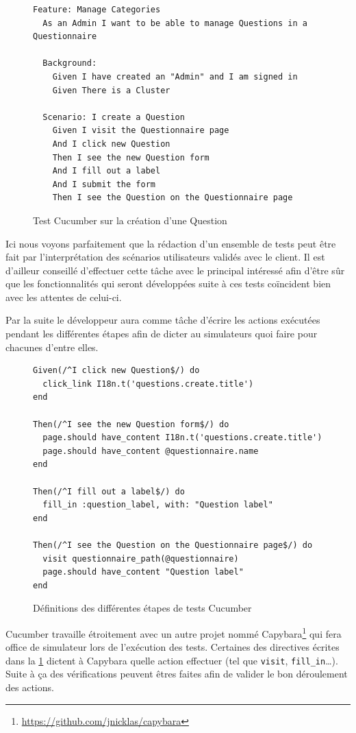 \documentclass[12pt,a4paper]{book}
\begin{document}
\begin{figure}[h]
\lstset{language=ruby}
\begin{lstlisting}
Feature: Manage Categories
  As an Admin I want to be able to manage Questions in a Questionnaire

  Background:
    Given I have created an "Admin" and I am signed in
    Given There is a Cluster

  Scenario: I create a Question
    Given I visit the Questionnaire page
    And I click new Question
    Then I see the new Question form
    And I fill out a label
    And I submit the form
    Then I see the Question on the Questionnaire page
\end{lstlisting}
 \caption{Test Cucumber sur la création d'une Question}
\end{figure}

Ici nous voyons parfaitement que la rédaction d'un ensemble de tests peut être fait par l'interprétation des scénarios utilisateurs validés avec le client. Il est d'ailleur conseillé d'effectuer cette tâche avec le principal intéressé afin d'être sûr que les fonctionnalités qui seront développées suite à ces tests coïncident bien avec les attentes de celui-ci.

Par la suite le développeur aura comme tâche d'écrire les actions exécutées pendant les différentes étapes afin de dicter au simulateurs quoi faire pour chacunes d'entre elles.

\begin{figure}[h]
\lstset{language=ruby}
\begin{lstlisting}
Given(/^I click new Question$/) do
  click_link I18n.t('questions.create.title')
end

Then(/^I see the new Question form$/) do
  page.should have_content I18n.t('questions.create.title')
  page.should have_content @questionnaire.name
end

Then(/^I fill out a label$/) do
  fill_in :question_label, with: "Question label"
end

Then(/^I see the Question on the Questionnaire page$/) do
  visit questionnaire_path(@questionnaire)
  page.should have_content "Question label"
end
\end{lstlisting}
 \caption{Définitions des différentes étapes de tests Cucumber}
 \label{fig.cucumber2}
\end{figure}

Cucumber travaille étroitement avec un autre projet nommé Capybara\footnote{\url{https://github.com/jnicklas/capybara}} qui fera office de simulateur lors de l'exécution des tests. Certaines des directives écrites dans la \cref{fig.cucumber2} dictent à Capybara quelle action effectuer (tel que \texttt{visit}, \texttt{fill\_in}\dots). Suite à ça des vérifications peuvent êtres faites afin de valider le bon déroulement des actions. 
\end{document}
